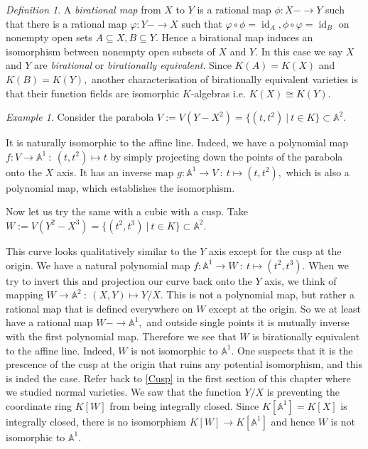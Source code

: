 \documentclass[BSc]{usydthesis}
\numberwithin{equation}{chapter}
\theoremstyle{remark}
\newtheorem{Definition}[equation]{Definition}
\newtheorem{Example}[equation]{Example}
\begin{document}
\begin{Definition}
A {\em birational map} from $X$ to $Y$ is a rational map $\phi:X-\to Y$ such that there is a rational map $\varphi:Y -\to X$ such that $\varphi\circ \phi = \operatorname{id}_A, \phi \circ \varphi = \operatorname{id}_B$ on nonempty open sets $A\subseteq X, B\subseteq Y.$ Hence a birational map induces an isomorphism between nonempty open subsets of $X$ and $Y.$ In this case we say $X$ and $Y$ are {\em birational} or {\em birationally equivalent}. Since $K(A)=K(X)$ and $K(B)=K(Y),$ another characterisation of birationally equivalent varieties is that their function fields are isomorphic $K$-algebras i.e. $K(X)\cong K(Y).$ 
\end{Definition}
\begin{Example}
 Consider the parabola $V:=V(Y-X^2)=\{ (t,t^2) \ | \ t\in K\} \subset \mathbb{A}^2.$
 
 
 It is naturally isomorphic to the affine line. Indeed, we have a polynomial map $f:V\to \mathbb{A}^1 \ : \ (t,t^2) \mapsto t$ by simply projecting down the points of the parabola onto the $X$ axis. It has an inverse map $g:\mathbb{A}^1 \to V \ : \ t\mapsto (t,t^2),$ which is also a polynomial map, which establishes the isomorphism. 
 
 Now let us try the same with a cubic with a cusp. Take $W:= V(Y^2-X^3) = \{ (t^2,t^3) \ | \ t\in K \} \subset \mathbb{A}^2.$ 

 This curve looks qualitatively similar to the $Y$ axis except for the cusp at the origin. We have a natural polynomial map $f:\mathbb{A}^1 \to W \ : \ t \mapsto (t^2, t^3).$ When we try to invert this and projection our curve back onto the $Y$ axis, we think of mapping $W\to \mathbb{A}^2 \ : \ (X,Y)\mapsto Y/X.$ This is not a polynomial map, but rather a rational map that is defined everywhere on $W$ except at the origin. So we at least have a rational map $W-\to \mathbb{A}^1,$ and outside single points it is mutually inverse with the first polynomial map. Therefore we see that $W$ is birationally equivalent to the affine line. Indeed, $W$ is not isomorphic to $\mathbb{A}^1.$ One suspects that it is the prescence of the cusp at the origin that ruins any potential isomorphism, and this is inded the case. Refer back to \ref{Cusp} in the first section of this chapter where we studied normal varieties. We saw that the function $Y/X$ is preventing the coordinate ring $K[W]$ from being integrally closed. Since $K[\mathbb{A}^1] = K[X]$ is integrally closed, there is no isomorphism $K[W]\to K[\mathbb{A}^1]$ and hence $W$ is not isomorphic to $\mathbb{A}^1.$ 
\end{Example}
\end{document}
